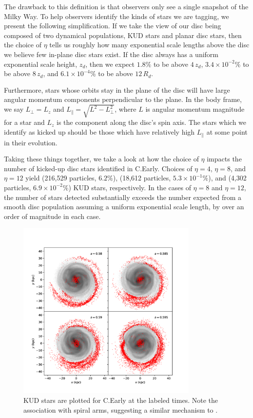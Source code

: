 The drawback to this definition is that observers only see a single snapshot of the Milky Way. To help observers identify the kinds of stars we are tagging, we present the following simplification. If we take the view of our disc being composed of two dynamical populations, KUD stars and planar disc stars, then the choice of $\eta$ tells us roughly how many exponential scale lengths above the disc we believe few in-plane disc stars exist. If the disc always has a uniform exponential scale height, $z_d$, then we expect $1.8\%$ to be above $4\,z_d$, $3.4 \times 10^{-2}\%$ to be above $8\,z_d$, and $6.1 \times 10^{-4}\%$ to be above $12 \,R_d$.

Furthermore, stars whose orbits stay in the plane of the disc will have large angular momentum components perpendicular to the plane. In the body frame, we say $L_\perp=L_z$ and $L_\parallel = \sqrt{L^2 - L_\perp^2}$, where $L$ is angular momentum magnitude for a star and $L_z$ is the component along the disc's spin axis. The stars which we identify as kicked up should be those which have relatively high $L_\parallel$ at some point in their evolution. 

Taking these things together, we take a look at how the choice of $\eta$ impacts the number of kicked-up disc stars identified in C.Early. Choices of $\eta=4$, $\eta=8$, and $\eta=12$ yield (216,529 particles, $6.2\%$), (18,612 particles, $5.3 \times 10^{-1}\%$), and (4,302 particles, $6.9 \times 10^{-2}\%$) KUD stars, respectively. In the cases of $\eta=8$ and $\eta=12$, the number of stars detected substantially exceeds the number expected from a smooth disc population assuming a uniform exponential scale length, by over an order of magnitude in each case. 
\begin{figure}
    \centering
	\includegraphics[width=0.8\textwidth]{../figures/fiducial_halo_268824_xy_s_016.pdf}
	\caption{KUD stars are plotted for C.Early at the labeled times. Note the association with spiral arms, suggesting a similar mechanism to \citet{laporte_2019_feathers}.}
	\label{fig:xy_tidal_tail_halo_c}
\end{figure}

